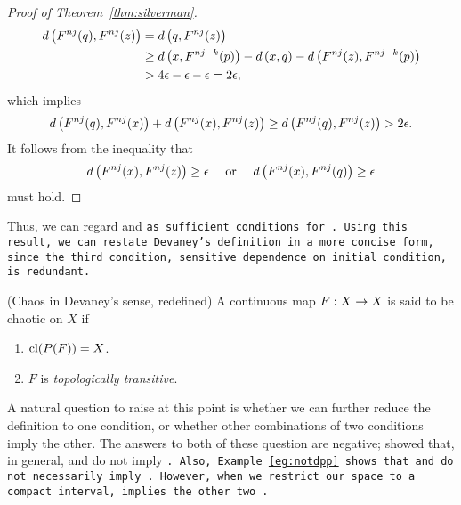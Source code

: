 \documentclass[10pt,draft,twoside]{book}
\begin{document}
\begin{proof}[Proof of Theorem~\ref{thm:silverman}]
\begin{align*}
    d\left( F^{nj}(q), F^{nj}(z) \right) 
    &= d\left( q, F^{nj}(z) \right)  \\
    &\geq  d\left( x, F^{nj-k}(p) \right) - d\left( x,q \right) - d\left( F^{nj}(z), F^{nj - k}(p) \right)  \\
    &> 4\epsilon - \epsilon - \epsilon 
    = 2\epsilon,
  \end{align*}
  which implies
  \begin{equation*}
    d\left( F^{nj}(q), F^{nj}(x) \right) + d\left( F^{nj}(x), F^{nj}(z) \right) 
    \geq d\left( F^{nj}(q), F^{nj}(z) \right)
    > 2\epsilon.
  \end{equation*}
  It follows from the inequality that 
  \begin{equation*}
    d\left( F^{nj}(x), F^{nj}(z) \right) \geq \epsilon \quad\mbox{ or }\quad d\left( F^{nj}(x), F^{nj}(q) \right) \geq \epsilon 
  \end{equation*}
  must hold.
\end{proof}

Thus, we can regard \dpp and \tt as sufficient conditions for \sdic.
Using this result, we can restate Devaney's definition in a more concise form, since the third condition, sensitive dependence on initial condition, is redundant.
\begin{definition}
  (Chaos in Devaney's sense, redefined) 
  A continuous map $F: X\rightarrow X$ is said to be chaotic on $X$ if
  \begin{enumerate}
    \item $\mathrm{cl}(P(F)) = X$.
    \item $F$ is \textit{topologically transitive}.
  \end{enumerate}
\end{definition}
A natural question to raise at this point is whether we can further reduce the definition to one condition, or whether other combinations of two conditions imply the other.
The answers to both of these question are negative; \citet{assaf} showed that, in general, \dpp and \sdic do not imply \tt.
Also, Example~\ref{eg:notdpp} shows that \sdic and \tt do not necessarily imply \dpp.
However, when we restrict our space to a compact interval, \tt implies the other two \citep{silverman}.
\end{document}
